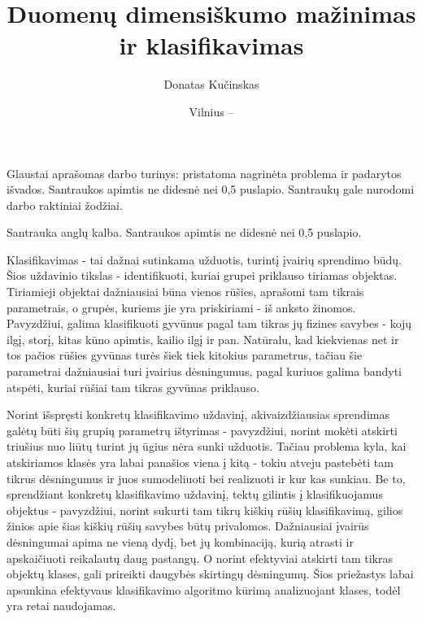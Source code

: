 \documentclass{VUMIFPSbakalaurinis}
\title{Duomenų dimensiškumo mažinimas ir klasifikavimas}
\author{Donatas Kučinskas}
\date{Vilnius – \the\year}
\begin{document}
\maketitle

\setcounter{page}{2}

Glaustai aprašomas darbo turinys: pristatoma nagrinėta problema ir padarytos
išvados. Santraukos apimtis ne didesnė nei 0,5 puslapio. Santraukų gale
nurodomi darbo raktiniai žodžiai. 

Santrauka anglų kalba. Santraukos apimtis ne didesnė nei 0,5 puslapio.

\tableofcontents

Klasifikavimas - tai dažnai sutinkama užduotis, turintį įvairių sprendimo būdų.
Šios uždavinio tikslas - identifikuoti, kuriai grupei priklauso tiriamas objektas.
Tiriamieji objektai dažniausiai būna vienos rūšies, aprašomi tam tikrais parametrais, o grupės, kuriems jie yra priskiriami - iš anksto žinomos.
Pavyzdžiui, galima klasifikuoti gyvūnus pagal tam tikras jų fizines savybes - kojų ilgį, storį, kitas kūno apimtis, kailio ilgį ir pan.
Natūralu, kad kiekvienas net ir tos pačios rūšies gyvūnas turės šiek tiek kitokius parametrus, tačiau šie parametrai dažniausiai turi įvairius dėsningumus, pagal kuriuos galima bandyti atspėti, kuriai rūšiai tam tikras gyvūnas priklauso.


Norint išspręsti konkretų klasifikavimo uždavinį, akivaizdžiausias sprendimas galėtų būti šių grupių parametrų ištyrimas - pavyzdžiui, norint mokėti atskirti triušius nuo liūtų turint jų ūgius nėra sunki užduotis.
Tačiau problema kyla, kai atskiriamos klasės yra labai panašios viena į kitą - tokiu atveju pastebėti tam tikrus dėsningumus ir juos sumodeliuoti bei realizuoti ir kur kas sunkiau.
Be to, sprendžiant konkretų klasifikavimo uždavinį, tektų gilintis į klasifikuojamus objektus - pavyzdžiui, norint sukurti tam tikrų kiškių rūšių klasifikavimą, gilios žinios apie šias kiškių rūšių savybes būtų privalomos.
Dažniausiai įvairūs dėsningumai apima ne vieną dydį, bet jų kombinaciją, kurią atrasti ir apskaičiuoti reikalautų daug pastangų.
O norint efektyviai atskirti tam tikras objektų klases, gali prireikti daugybės skirtingų dėsningumų.
Šios priežastys labai apsunkina efektyvaus klasifikavimo algoritmo kūrimą analizuojant klases, todėl yra retai naudojamas.
\end{document}
